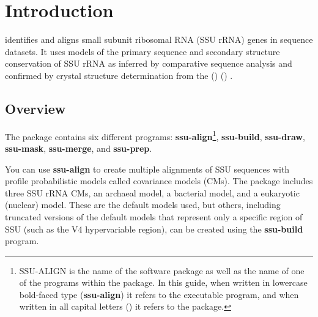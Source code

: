 \section{Introduction}

 identifies and aligns small subunit ribosomal RNA
(SSU rRNA) genes in sequence datasets. It uses models of the primary
sequence and secondary structure conservation of SSU rRNA as inferred
by comparative sequence analysis and confirmed by crystal structure
determination from the  () 
()
\cite{CannoneGutell02}.

\subsection{Overview}
The  package contains six different
programs: \textbf{ssu-align}\footnote{SSU-ALIGN is the name of the
  software package as well as the name of one of the programs within
  the package. In this guide, when written in lowercase bold-faced
  type (\textbf{ssu-align}) it refers to the executable program, and
  when written in all capital letters () it refers to
  the package.},
\textbf{ssu-build}, \textbf{ssu-draw}, 
\textbf{ssu-mask}, \textbf{ssu-merge}, and \textbf{ssu-prep}. 

You can use \textbf{ssu-align} to create multiple alignments of SSU
sequences with profile probabilistic models called covariance models
(CMs). The package includes three SSU rRNA CMs, an archaeal model,
a bacterial model, and a eukaryotic (nuclear) model. These are the
default models used, but others, including truncated versions of the
default models that represent only a specific region of SSU (such as
the V4 hypervariable region), can be created using the
\textbf{ssu-build} program.

